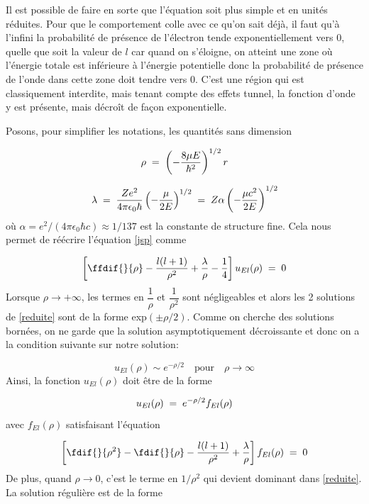 Il est possible de faire en sorte que l'équation soit plus simple et en unités réduites. Pour que le comportement colle avec ce qu'on sait déjà, il faut qu'à l'infini la probabilité de présence de l'électron tende exponentiellement vers 0, quelle que soit la valeur de $l$ car quand on s'éloigne, on atteint une zone où l'énergie totale est inférieure à l'énergie potentielle donc la probabilité de présence de l'onde dans cette zone doit tendre vers 0. C'est une région qui est classiquement interdite, mais tenant compte des effets tunnel, la fonction d'onde y est présente, mais décroît de façon exponentielle.


Posons, pour simplifier les notations, les quantités sans dimension

\[
    \rho\; = \;\left(-\dfrac{8\mu E}{\hbar^2}\right)^{1/2}r
\]

\begin{equation}
    \lambda\; = \;\dfrac{Ze^2}{4\pi\epsilon_0 \hbar}\left(-\dfrac{\mu}{2E}\right)^{1/2}\; = \; Z\alpha\left(-\dfrac{\mu c^2}{2E}\right)^{1/2}
    \label{lambda}
\end{equation}
où $\alpha=e^2/(4\pi\epsilon_0 \hbar c) \approx 1/137$ est la constante de structure fine. Cela nous permet de réécrire l'équation \eqref{jsp} comme


\begin{equation}
    \left[\ffdif{}{\rho}-\dfrac{l(l+1)}{\rho^2}+\dfrac{\lambda}{\rho}-\dfrac{1}{4}\right]u_{El}(\rho)\eq0
    \label{reduite}
\end{equation}
Lorsque $\rho \rightarrow +\infty$, les termes en $\dfrac{1}{\rho}$ et $\dfrac{1}{\rho^2}$ sont négligeables et alors les 2 solutions de \eqref{reduite} sont de la forme exp$(\pm \rho/2)$. Comme on cherche des solutions bornées, on ne garde que la solution asymptotiquement décroissante et donc on a la condition suivante sur notre solution:

\[
    u_{El}(\rho)\sim e^{-\rho/2} \quad \text{pour} \quad \rho \longrightarrow \infty
\]
Ainsi, la fonction $u_{El}(\rho)$ doit être de la forme

\[
    u_{El}(\rho)\; = \; e^{-\rho/2}f_{El}(\rho)
\]
avec $f_{El}(\rho)$ satisfaisant l'équation

\begin{equation}
 \left[\fdif{}{\rho^2}-\fdif{}{\rho}-\dfrac{l(l+1)}{\rho^2}+\dfrac{\lambda}{\rho}\right]f_{El}(\rho)\eq0
 \label{fel}
\end{equation}
De plus, quand $\rho \longrightarrow 0$, c'est le terme en $1/\rho^2$ qui devient dominant dans \eqref{reduite}. La solution régulière est de la forme

